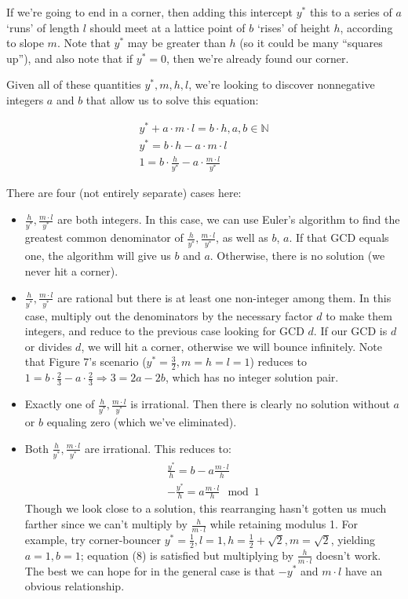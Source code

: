 \documentclass[11pt, oneside]{article} 	%
\begin{document}
If we're going to end in a corner, then adding this intercept $y^*$ this to a series of $a$ `runs' of length $l$ should meet at a lattice point of $b$ `rises' of height $h$, according to slope $m$. Note that $y^*$ may be greater than $h$ (so it could be many ``squares up''), and also note that if $y^* = 0$, then we're already found our corner. 

Given all of these quantities $y^*, m, h, l$, we're looking to discover nonnegative integers $a$ and $b$ that allow us to solve this equation:

\begin{align}
y^* + a\cdot m \cdot l = b \cdot h, a, b \in \mathbb{N} \\ 
y^* = b \cdot h -  a\cdot m \cdot l \\
1 = b \cdot \frac{h}{y^*} -  a\cdot \frac{m \cdot l}{y^*} 
\end{align}

There are four (not entirely separate) cases here:

\begin{itemize}
\item $\frac{h}{y^*}, \frac{m \cdot l}{y^*}$ are both integers. In this case, we can use Euler's algorithm to find the greatest common denominator of $\frac{h}{y^*}, \frac{m \cdot l}{y^*}$, as well as $b$, $a$. If that GCD equals one, the algorithm will give us $b$ and $a$. Otherwise, there is no solution (we never hit a corner).
\item $\frac{h}{y^*}, \frac{m \cdot l}{y^*}$ are rational but there is at least one non-integer among them. In this case, multiply out the denominators by the necessary factor $d$ to make them integers, and reduce to the previous case looking for GCD $d$. If our GCD is $d$ or divides $d$, we will hit a corner, otherwise we will bounce infinitely. Note that Figure 7's scenario ($y^* = \frac{3}{2}, m = h = l = 1$) reduces to $1 = b \cdot \frac{2}{3} - a  \cdot \frac{2}{3} \Rightarrow 3 = 2a-2b$, which has no integer solution pair.
\item Exactly one of $\frac{h}{y^*}, \frac{m \cdot l}{y^*}$ is irrational. Then there is clearly no solution without $a$ or $b$ equaling zero (which we've eliminated).
\item Both $\frac{h}{y^*}, \frac{m \cdot l}{y^*}$ are irrational. This reduces to:
\begin{align}
\frac{y^*}{h} = b - a\frac{m \cdot l}{h} \\
-\frac{y^*}{h} = a\frac{m \cdot l}{h} \mod 1 
\end{align}
Though we look close to a solution, this rearranging hasn't gotten us much farther since we can't multiply by $\frac{h}{m \cdot l}$ while retaining modulus 1. For example, try corner-bouncer $y^* = \frac{1}{2}, l = 1, h = \frac{1}{2} + \sqrt{2}, m = \sqrt{2}$, yielding $a = 1, b = 1$; equation (8) is satisfied but multiplying by $\frac{h}{m \cdot l}$ doesn't work. The best we can hope for in the general case is that $-y^*$ and $m \cdot l$ have an obvious relationship.

\end{itemize}
\end{document}
